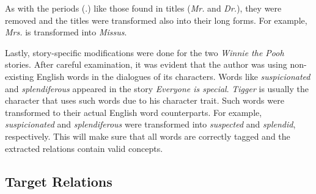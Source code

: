 As with the periods (.) like those found in titles (\textit{Mr.} and \textit{Dr.}), they were removed and the titles were transformed also into their long forms. For example, \textit{Mrs.} is transformed into \textit{Missus}. 

Lastly, story-specific modifications were done for the two \textit{Winnie the Pooh} stories. After careful examination, it was evident that the author was using non-existing English words in the dialogues of its characters. Words like \textit{suspicionated} and \textit{splendiferous} appeared in the story \textit{Everyone is special}. \textit{Tigger} is usually the character that uses such words due to his character trait. Such words were transformed to their actual English word counterparts. For example, \textit{suspicionated} and \textit{splendiferous} were transformed into \textit{suspected} and \textit{splendid}, respectively. This will make sure that all words are correctly tagged and the extracted relations contain valid concepts.

\subsection{Target Relations}
\label{sec:relations}


